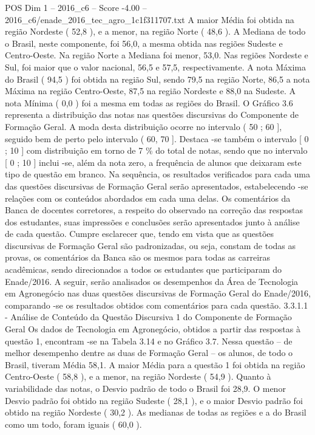 \begin{textsample}{POS Dim 1 – 2016\_c6 – Score -4.00 – 2016\_c6/enade\_2016\_tec\_agro\_1c1f311707.txt}
A maior Média foi obtida na região Nordeste ( 52,8 ), e a menor, na região Norte ( 48,6 ).
A Mediana de todo o Brasil, neste componente, foi 56,0, a mesma obtida nas regiões Sudeste e Centro-Oeste.
Na região Norte a Mediana foi menor, 53,0.
Nas regiões Nordeste e Sul, foi maior que o valor nacional, 56,5 e 57,5, respectivamente.
A nota Máxima do Brasil ( 94,5 ) foi obtida na região Sul, sendo 79,5 na região Norte, 86,5 a nota Máxima na região Centro-Oeste, 87,5 na região Nordeste e 88,0 na Sudeste.
A nota Mínima ( 0,0 ) foi a mesma em todas as regiões do Brasil.
O Gráfico 3.6 representa a distribuição das notas nas questões discursivas do Componente de Formação Geral.
A moda desta distribuição ocorre no intervalo ( 50 ; 60 ], seguido bem de perto pelo intervalo ( 60, 70 ].
Destaca -se também o intervalo [ 0 ; 10 ] com distribuição em torno de 7 \% do total de notas, sendo que no intervalo [ 0 ; 10 ] inclui -se, além da nota zero, a frequência de alunos que deixaram este tipo de questão em branco.
Na sequência, os resultados verificados para cada uma das questões discursivas de Formação Geral serão apresentados, estabelecendo -se relações com os conteúdos abordados em cada uma delas.
Os comentários da Banca de docentes corretores, a respeito do observado na correção das respostas dos estudantes, suas impressões e conclusões serão apresentados junto à análise de cada questão.
Cumpre esclarecer que, tendo em vista que as questões discursivas de Formação Geral são padronizadas, ou seja, constam de todas as provas, os comentários da Banca são os mesmos para todas as carreiras acadêmicas, sendo direcionados a todos os estudantes que participaram do Enade/2016.
A seguir, serão analisados os desempenhos da Área de Tecnologia em Agronegócio nas duas questões discursivas de Formação Geral do Enade/2016, comparando -se os resultados obtidos com comentários para cada questão. 3.3.1.1 - Análise de Conteúdo da Questão Discursiva 1 do Componente de Formação Geral Os dados de Tecnologia em Agronegócio, obtidos a partir das respostas à questão 1, encontram -se na Tabela 3.14 e no Gráfico 3.7.
Nessa questão – de melhor desempenho dentre as duas de Formação Geral – os alunos, de todo o Brasil, tiveram Média 58,1.
A maior Média para a questão 1 foi obtida na região Centro-Oeste ( 58,8 ), e a menor, na região Nordeste ( 54,9 ).
Quanto à variabilidade das notas, o Desvio padrão de todo o Brasil foi 28,9.
O menor Desvio padrão foi obtido na região Sudeste ( 28,1 ), e o maior Desvio padrão foi obtido na região Nordeste ( 30,2 ).
As medianas de todas as regiões e a do Brasil como um todo, foram iguais ( 60,0 ).

\end{textsample}
